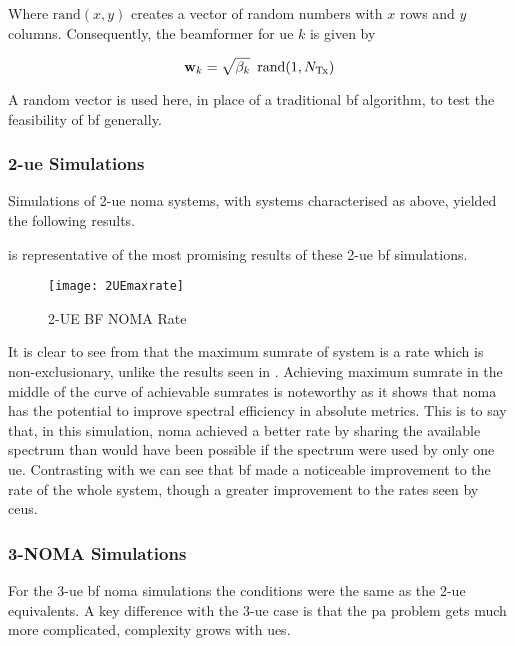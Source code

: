 \par
Where $\textrm{rand}(x,y)$ creates a vector of random numbers with $x$ rows and $y$ columns.
Consequently, the beamformer for \ac{ue} $k$ is given by 

\begin{equation}
	\mathbf{w}_k = \sqrt{\beta_k} \enspace \textrm{rand}(1, N_{\textrm{Tx}})
\end{equation}

\par
A random vector is used here, in place of a traditional \ac{bf} algorithm, to test the feasibility of \ac{bf} generally.

\subsubsection{2-\acs{ue} Simulations}
\label{sec:rbf2ue}
Simulations of 2-\ac{ue} \ac{noma} systems, with systems characterised as above, yielded the following results.

\par
{} is representative of the most promising results of these 2-\ac{ue} \ac{bf} simulations.

\begin{figure}[htb]
	\centering
	\texttt{[image: 2UEmaxrate]}
	\caption{2-UE BF NOMA Rate}
	\label{fig:bf2ueRate}
\end{figure}

\par
It is clear to see from  that the maximum sumrate of system is a rate which is non-exclusionary, unlike the results seen in .
Achieving maximum sumrate in the middle of the curve of achievable sumrates is noteworthy as it shows that \ac{noma} has the potential to improve spectral efficiency in absolute metrics.
This is to say that, in this simulation, \ac{noma} achieved a better rate by sharing the available spectrum than would have been possible if the spectrum were used by only one \ac{ue}.
Contrasting  with  we can see that \ac{bf} made a noticeable improvement to the rate of the whole system, though a greater improvement to the rates seen by \acp{ceu}.

\subsubsection{3-NOMA Simulations}
\label{sec:rbf3ue}
For the 3-\ac{ue} \ac{bf} \ac{noma} simulations the conditions were the same as the 2-\ac{ue} equivalents.
A key difference with the 3-\ac{ue} case is that the \ac{pa} problem gets much more complicated, complexity grows with \acp{ue}.

